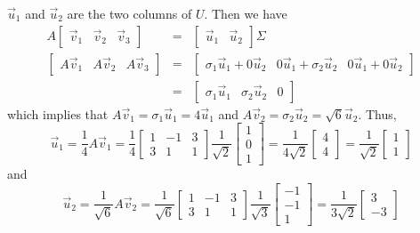 \documentclass{ximera}
\begin{document}
\begin{example}
\begin{explanation}
$\vec{u}_1$ and $\vec{u}_2$ are the two columns of $U$. Then we have
\begin{eqnarray*}
A\left[\begin{array}{ccc} \vec{v}_1 & \vec{v}_2 & \vec{v}_3 \end{array}\right]
&=& \left[\begin{array}{cc} \vec{u}_1 & \vec{u}_2 \end{array}\right]\Sigma\\
\left[\begin{array}{ccc} A\vec{v}_1 & A\vec{v}_2 & A\vec{v}_3 \end{array}\right]
&=& \left[\begin{array}{ccc} \sigma_1\vec{u}_1 + 0\vec{u}_2 &
0\vec{u}_1 + \sigma_2 \vec{u}_2 & 0 \vec{u}_1 + 0\vec{u}_2 \end{array}\right] \\
&=& \left[\begin{array}{ccc} \sigma_1\vec{u}_1 & \sigma_2 \vec{u}_2 &
0 \end{array}\right]
\end{eqnarray*}
which implies that $A\vec{v}_1=\sigma_1\vec{u}_1 = 4\vec{u}_1$ and
$A\vec{v}_2=\sigma_2\vec{u}_2 = \sqrt 6 \vec{u}_2$. Thus,
\[ \vec{u}_1 = \frac{1}{4}A\vec{v}_1
= \frac{1}{4}
\left[\begin{array}{rrr} 1 & -1 & 3 \\ 3 & 1 & 1 \end{array}\right]
\frac{1}{\sqrt{2}}\left[\begin{array}{r} 1\\ 0\\ 1 \end{array}\right]
= \frac{1}{4\sqrt 2}\left[\begin{array}{r} 4\\ 4 \end{array}\right]
= \frac{1}{\sqrt 2}\left[\begin{array}{r} 1\\ 1 \end{array}\right]\]
and
\[ \vec{u}_2 = \frac{1}{\sqrt 6}A\vec{v}_2
= \frac{1}{\sqrt 6}
\left[\begin{array}{rrr} 1 & -1 & 3 \\ 3 & 1 & 1 \end{array}\right]
\frac{1}{\sqrt{3}}\left[\begin{array}{r} -1\\ -1\\ 1 \end{array}\right]
=\frac{1}{3\sqrt 2}\left[\begin{array}{r} 3\\ -3 \end{array}\right]
\]
\end{explanation}
\end{example}
\end{document}

